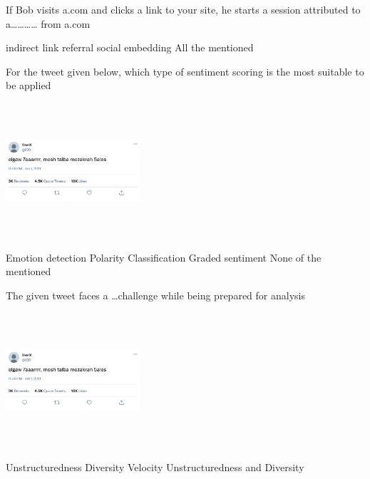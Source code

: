 \documentclass[theme=sleek, randomorder, hidesidemenu]{webquiz}
\begin{document}
\begin{question}
  If Bob visits a.com and clicks a link to your site, he starts a session attributed
to a………… from a.com
\begin{choice}[columns=2]
  \incorrect indirect link
  \correct referral
  \incorrect social embedding
  \incorrect All the mentioned
\end{choice}
\end{question}

\begin{question}
  For the tweet given below, which type of sentiment scoring is the most suitable
to be applied
  \begin{center}
    \includegraphics[height=50mm, width=50mm]{tweet.png}
  \end{center}
  \begin{choice}[columns=2]
    \correct Emotion detection
    \incorrect Polarity Classification
    \incorrect Graded sentiment
    \incorrect None of the mentioned
  \end{choice}
\end{question}

\begin{question}
  The given tweet faces a \ldots challenge while being prepared for analysis
  \begin{center}
    \includegraphics[height=50mm, width=50mm]{tweet.png}
  \end{center}
  \begin{choice}[columns=2]
    \incorrect Unstructuredness
    \incorrect Diversity
    \incorrect Velocity
    \correct Unstructuredness and Diversity
  \end{choice}
\end{question}
\end{document}

